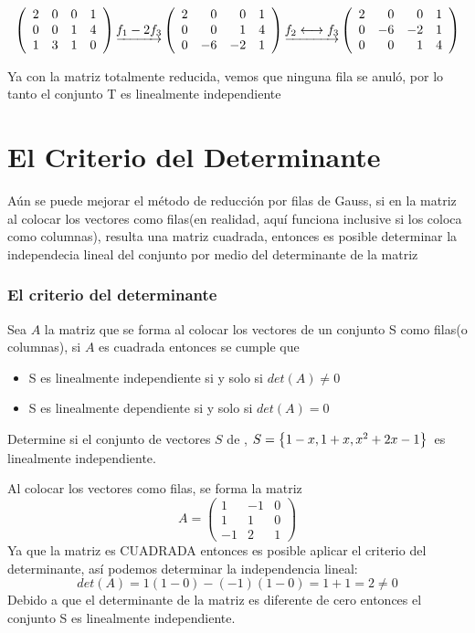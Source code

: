 \[
\reducir{rrrr}{
2&0&0&1\\
0&0&1&4\\
1&3&1&0
}
\underrightarrow{f_1 - 2f_3}
\reducir{rrrr}{
2&0&0&1\\
0&0&1&4\\
0&-6&-2&1
}
\underrightarrow{f_2 \longleftrightarrow f_3}
\reducir{rrrr}{
2&0&0&1\\
0&-6&-2&1\\
0&0&1&4
}
\]

Ya con la matriz totalmente reducida, vemos que ninguna fila se anul\'o, por lo tanto el conjunto T es linealmente independiente
\section{El Criterio del Determinante}
A\'un se puede mejorar el método de reducción por filas de Gauss, si en la matriz al colocar los vectores como filas(en realidad, aqu\'i funciona inclusive si los coloca como columnas), resulta una matriz cuadrada, entonces es posible determinar la independecia lineal del conjunto por medio del determinante de la matriz

\subsubsection{El criterio del determinante}
\begin{theorem}
Sea $A$ la matriz que se forma al colocar los vectores de un conjunto S como filas(o columnas), si $A$ es cuadrada entonces se cumple que 
\begin{itemize}
\item S es linealmente independiente si y solo si $det(A)\neq 0$
\item S es linealmente dependiente si y solo si $det(A)=0$
\end{itemize}

\end{theorem}


\begin{ejemplo}
Determine si el conjunto de vectores $S$ de \pdos, $S=\llav{1-x, 1+x, x^2+2x-1}$\ es linealmente independiente.
\end{ejemplo}

Al colocar los vectores como filas, se forma la matriz
\[A=
\left(
\begin{array}{rrr}
1&-1&0\\
1&1&0\\
-1&2&1
\end{array}
\right)
\]
Ya que la matriz es CUADRADA entonces es posible aplicar el criterio del determinante, así podemos determinar la independencia lineal:
\[det(A)=1(1-0)-(-1)(1-0)=1+1=2\neq 0\]
Debido a que el determinante de la matriz es diferente de cero entonces el conjunto S es linealmente independiente.
~\\
~\\



